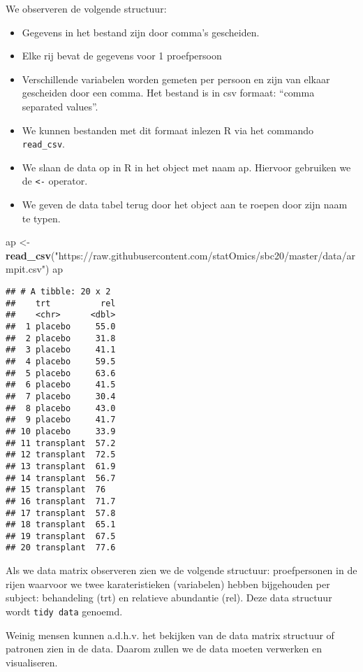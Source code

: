 \documentclass[
  12pt,dutch,coursenotes]{book}
\newenvironment{Shaded}{\begin{snugshade}}{\end{snugshade}}
\newcommand{\KeywordTok}[1]{\textcolor[rgb]{0.13,0.29,0.53}{\textbf{#1}}}
\newcommand{\NormalTok}[1]{#1}
\newcommand{\StringTok}[1]{\textcolor[rgb]{0.31,0.60,0.02}{#1}}
\providecommand{\tightlist}{%
  \setlength{\itemsep}{0pt}\setlength{\parskip}{0pt}}
\theoremstyle{definition}
\theoremstyle{definition}
\theoremstyle{definition}
\theoremstyle{remark}
\begin{document}
We observeren de volgende structuur:

\begin{itemize}
\tightlist
\item
  Gegevens in het bestand zijn door comma's gescheiden.
\item
  Elke rij bevat de gegevens voor 1 proefpersoon
\item
  Verschillende variabelen worden gemeten per persoon en zijn van elkaar gescheiden door een comma. Het bestand is in csv formaat: ``comma separated values''.
\item
  We kunnen bestanden met dit formaat inlezen R via het commando \texttt{read\_csv}.
\item
  We slaan de data op in R in het object met naam ap. Hiervoor gebruiken we de \texttt{\textless{}-} operator.
\item
  We geven de data tabel terug door het object aan te roepen door zijn naam te typen.
\end{itemize}

\begin{Shaded}
\begin{Highlighting}[]
\NormalTok{ap \textless{}{-}}\StringTok{ }\KeywordTok{read\_csv}\NormalTok{(}\StringTok{"https://raw.githubusercontent.com/statOmics/sbc20/master/data/armpit.csv"}\NormalTok{)}
\NormalTok{ap}
\end{Highlighting}
\end{Shaded}

\begin{verbatim}
## # A tibble: 20 x 2
##    trt          rel
##    <chr>      <dbl>
##  1 placebo     55.0
##  2 placebo     31.8
##  3 placebo     41.1
##  4 placebo     59.5
##  5 placebo     63.6
##  6 placebo     41.5
##  7 placebo     30.4
##  8 placebo     43.0
##  9 placebo     41.7
## 10 placebo     33.9
## 11 transplant  57.2
## 12 transplant  72.5
## 13 transplant  61.9
## 14 transplant  56.7
## 15 transplant  76  
## 16 transplant  71.7
## 17 transplant  57.8
## 18 transplant  65.1
## 19 transplant  67.5
## 20 transplant  77.6
\end{verbatim}

Als we data matrix observeren zien we de volgende structuur:
proefpersonen in de rijen waarvoor we twee karateristieken (variabelen) hebben bijgehouden per subject:
behandeling (trt) en relatieve abundantie (rel).
Deze data structuur wordt \texttt{tidy\ data} genoemd.

Weinig mensen kunnen a.d.h.v. het bekijken van de data matrix structuur of patronen zien in de data. Daarom zullen we de data moeten verwerken en visualiseren.
\end{document}
